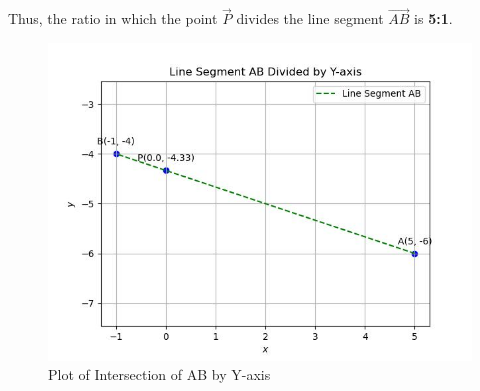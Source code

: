 \documentclass[journal]{IEEEtran}
\begin{document}
Thus, the ratio in which the point $\vec{P}$ divides the line segment $\vec{AB}$ is \textbf{5:1}. \\

\begin{figure}
    \centering
    \includegraphics[width=0.7\columnwidth]{figs/plot_c.jpg}
    \caption*{Plot of Intersection of AB by Y-axis}
    \label{fig:fig}
\end{figure}
\end{document}
